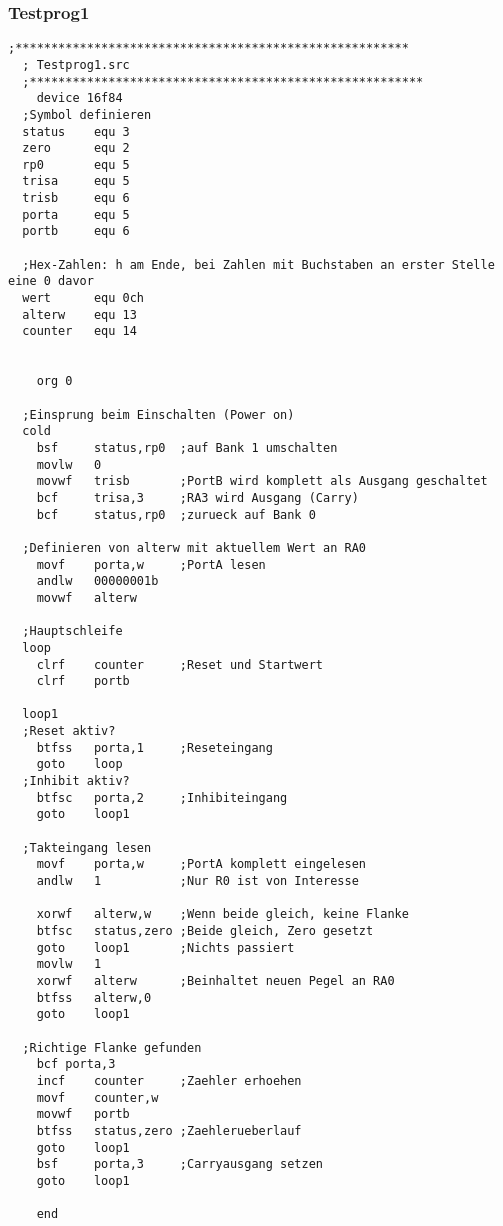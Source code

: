 \subsubsection*{Testprog1}
\begin{lstlisting}[language={[x86masm]Assembler}]
  ;*******************************************************
  ; Testprog1.src
  ;*******************************************************
    device 16f84
  ;Symbol definieren
  status    equ 3
  zero      equ 2
  rp0 	    equ 5
  trisa	    equ 5
  trisb	    equ 6
  porta	    equ 5
  portb	    equ 6
  
  ;Hex-Zahlen: h am Ende, bei Zahlen mit Buchstaben an erster Stelle eine 0 davor
  wert	    equ 0ch
  alterw	equ 13
  counter   equ 14
  
  
    org 0
    
  ;Einsprung beim Einschalten (Power on)
  cold
    bsf	    status,rp0	;auf Bank 1 umschalten
    movlw	0
    movwf	trisb		;PortB wird komplett als Ausgang geschaltet
    bcf 	trisa,3		;RA3 wird Ausgang (Carry)
    bcf	    status,rp0	;zurueck auf Bank 0
  
  ;Definieren von alterw mit aktuellem Wert an RA0
    movf	porta,w		;PortA lesen
    andlw	00000001b
    movwf	alterw
  
  ;Hauptschleife
  loop
    clrf	counter		;Reset und Startwert
    clrf	portb

  loop1
  ;Reset aktiv?
    btfss	porta,1		;Reseteingang
    goto 	loop
  ;Inhibit aktiv?
    btfsc	porta,2		;Inhibiteingang
    goto 	loop1
  
  ;Takteingang lesen
    movf	porta,w		;PortA komplett eingelesen
    andlw	1		    ;Nur R0 ist von Interesse
  
    xorwf	alterw,w	;Wenn beide gleich, keine Flanke
    btfsc	status,zero	;Beide gleich, Zero gesetzt
    goto	loop1		;Nichts passiert
    movlw   1
    xorwf	alterw		;Beinhaltet neuen Pegel an RA0
    btfss	alterw,0
    goto	loop1
  
  ;Richtige Flanke gefunden
    bcf	porta,3
    incf	counter		;Zaehler erhoehen
    movf 	counter,w
    movwf	portb
    btfss	status,zero	;Zaehlerueberlauf
    goto	loop1
    bsf	    porta,3		;Carryausgang setzen
    goto	loop1
  
    end

\end{lstlisting}